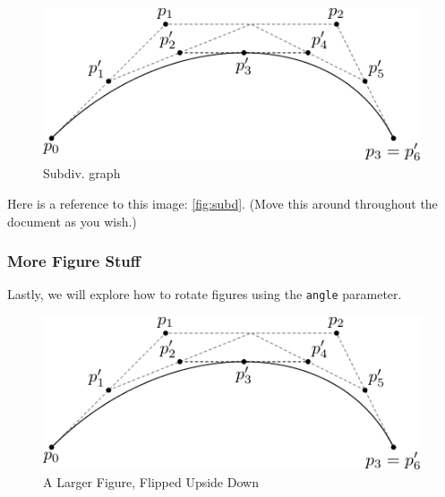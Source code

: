 \documentclass[12pt,twoside]{amherstthesis}
\begin{document}
  \begin{figure}[htbp]
  \centering
  \includegraphics[scale = 0.75,angle = 0]{figure/subdivision.pdf}
  \caption[Subdiv. graph]{\normalsize{Subdiv. graph}}
  \label{fig:subd}
  \end{figure}
  
  Here is a reference to this image: \autoref{fig:subd}. (Move this around
  throughout the document as you wish.)
  
  \subsubsection{More Figure Stuff}\label{more-figure-stuff}
  
  Lastly, we will explore how to rotate figures using the \texttt{angle}
  parameter.
  
  \begin{Shaded}
  \begin{Highlighting}[]
  \NormalTok{(}\NormalTok{, }
        \NormalTok{, }
         \NormalTok{,}
         \NormalTok{,}
         \NormalTok{)}
  \end{Highlighting}
  \end{Shaded}
  
  \begin{figure}[htbp]
  \centering
  \includegraphics[scale = 1.5,angle = 180]{figure/subdivision.pdf}
  \caption[A Larger Figure, Flipped Upside Down]{\normalsize{A Larger Figure, Flipped Upside Down}}
  \label{fig:subd2}
  \end{figure}
  
\end{document}
